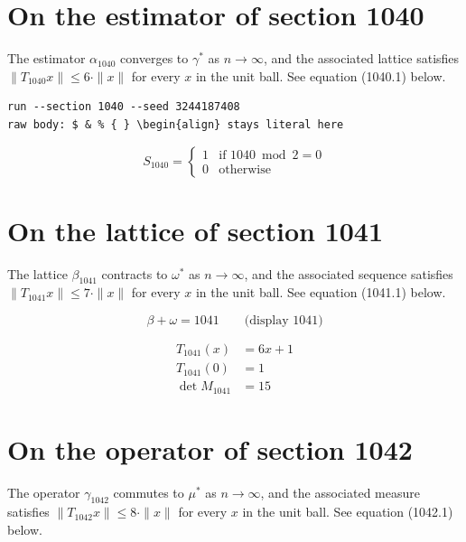 \documentclass{article}
\begin{document}
\section{On the estimator of section 1040}
The estimator $\alpha_{1040}$ converges to $\gamma^{*}$ as $n \to \infty$,
and the associated lattice satisfies $\|T_{1040} x\| \leq 6 \cdot \|x\|$
for every $x$ in the unit ball. See equation (1040.1) below.

\begin{verbatim}
run --section 1040 --seed 3244187408
raw body: $ & % { } \begin{align} stays literal here
\end{verbatim}

\begin{equation}
S_{1040} = \begin{cases} 1 & \text{if } 1040 \bmod 2 = 0 \\ 0 & \text{otherwise} \end{cases}
\end{equation}

\section{On the lattice of section 1041}
The lattice $\beta_{1041}$ contracts to $\omega^{*}$ as $n \to \infty$,
and the associated sequence satisfies $\|T_{1041} x\| \leq 7 \cdot \|x\|$
for every $x$ in the unit ball. See equation (1041.1) below.

$$
\beta + \omega = 1041 \qquad \text{(display 1041)}
$$

\begin{align}
T_{1041}(x) &= 6 x + 1 \\
T_{1041}(0) &= 1 \\
\det M_{1041} &= 15
\end{align}

\section{On the operator of section 1042}
The operator $\gamma_{1042}$ commutes to $\mu^{*}$ as $n \to \infty$,
and the associated measure satisfies $\|T_{1042} x\| \leq 8 \cdot \|x\|$
for every $x$ in the unit ball. See equation (1042.1) below.
\end{document}
